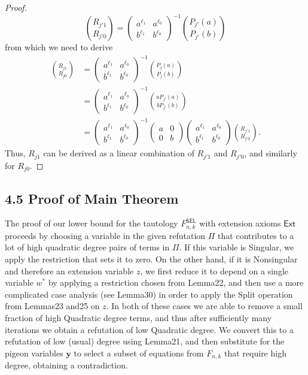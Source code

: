 \documentclass[10pt,a4paper]{article}
\begin{document}
\begin{proof}
\[\binom{R_{j'1}}{R_{j'0}}=\begin{pmatrix}a^{\ell_1}&a^{\ell_0}\\b^{\ell_1}&b^{\ell_0}\end{pmatrix}^{-1}\binom{P_{j'}(a)}{P_{j'}(b)}\]
from which we need to derive
\begin{align*}
\binom{R_{j1}}{R_{j0}}&=\begin{pmatrix}a^{\ell_1}&a^{\ell_0}\\b^{\ell_1}&b^{\ell_0}\end{pmatrix}^{-1}\binom{P_j(a)}{P_j(b)}\\
&=\begin{pmatrix}a^{\ell_1}&a^{\ell_0}\\b^{\ell_1}&b^{\ell_0}\end{pmatrix}^{-1}\binom{aP_{j'}(a)}{bP_{j'}(b)}\\
&=\begin{pmatrix}a^{\ell_1}&a^{\ell_0}\\b^{\ell_1}&b^{\ell_0}\end{pmatrix}^{-1}\begin{pmatrix}a&0\\0&b\end{pmatrix}\begin{pmatrix}a^{\ell_1}&a^{\ell_0}\\b^{\ell_1}&b^{\ell_0}\end{pmatrix}\binom{R_{j'1}}{R_{j'0}}.
\end{align*}
Thus, $R_{j1}$ can be derived as a linear combination of $R_{j'1}$ and $R_{j'0}$, and similarly for $R_{j0}$.
\end{proof}

\subsection*{4.5 Proof of Main Theorem}
The proof of our lower bound for the tautology $F^{\mathsf{SEL}}_{n,k}$ with extension axioms $\mathsf{Ext}$ proceeds by choosing a variable in the given refutation $\Pi$ that contributes to a lot of high quadratic degree pairs of terms in $\Pi$. If this variable is Singular, we apply the restriction that sets it to zero. On the other hand, if it is Nonsingular and therefore an extension variable $z$, we first reduce it to depend on a single variable $w^*$ by applying a restriction chosen from Lemma22, and then use a more complicated case analysis (see Lemma30) in order to apply the Split operation from Lemmas23 and25 on $z$. In both of these cases we are able to remove a small fraction of high Quadratic degree terms, and thus after sufficiently many iterations we obtain a refutation of low Quadratic degree. We convert this to a refutation of low (usual) degree using Lemma21, and then substitute for the pigeon variables $\mathbf y$ to select a subset of equations from $F_{n,k}$ that require high degree, obtaining a contradiction.
\end{document}
